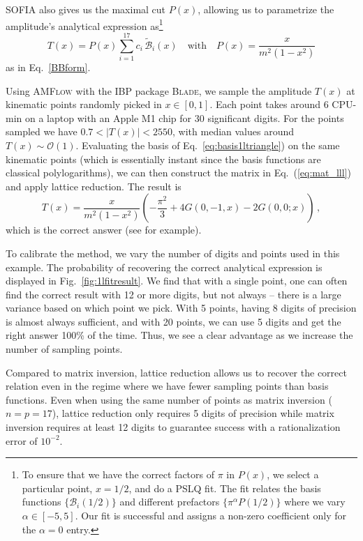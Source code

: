 \documentclass[a4paper,11pt]{article}
\begin{document}
\textsc{SOFIA} also gives us the maximal cut $P(x)$, allowing us to parametrize the amplitude's analytical expression as\footnote{To ensure that we have the correct factors of $\pi$ in $P(x)$, we select a particular point, $x=1/2$, and do a PSLQ fit. The fit relates the basis functions $\{\mathcal{B}_i(1/2)\}$ and different prefactors $\{\pi^\alpha P(1/2)\}$ where we vary $\alpha \in [-5,5]$. Our fit is successful and assigns a non-zero coefficient only for the $\alpha=0$ entry.}
\begin{equation}
    T(x) = P(x) \sum_{i=1}^{17} c_i \, \tilde{\mathcal{B}}_i (x) \quad \text{with} \quad P(x)=\frac{x}{m^2(1-x^2)}
\end{equation}
as in Eq.~\eqref{BBform}.

Using \textsc{AMFlow} with the IBP package \textsc{Blade}, we sample the amplitude $T(x)$ at kinematic points randomly picked in $x\in[0,1]$. Each point takes around 6 CPU-min on a laptop with an Apple M1 chip for 30 significant digits. For the points sampled we have $0.7<|T(x)|<2550$, with median values around $T(x)\sim \mathcal{O}(1)$. 
Evaluating the basis of Eq.~\eqref{eq:basis1ltriangle}) on the same kinematic points (which is essentially instant since the basis functions are classical polylogarithms), we can then construct the matrix in Eq.~(\ref{eq:mat_lll}) and apply lattice reduction.
The result is 
\begin{equation}
    T(x) = \frac{x}{m^2 (1-x^2)} \left(-\frac{\pi^2}{3} + 4 G(0,-1,x) - 2 G(0,0;x)\right) \,,
\end{equation}
which is the correct answer (see \cite{Gehrmann:2013cxs} for example). 

To calibrate the method, we vary the number of digits and points used in this example. The probability of recovering the correct analytical expression is displayed in Fig.~\ref{fig:1lfitresult}. 
We find that with a single point, one can often find the correct result with 12 or more digits, but not always -- there is a large variance based on which point we pick. With 5 points, having 8 digits of precision is almost always sufficient, and with 20 points, we can use 5 digits and get the right answer 100\% of the time.  
Thus, we see a clear advantage as we increase the number of sampling points. 

Compared to  matrix inversion, lattice reduction allows us to recover the correct relation even in the regime where we have fewer sampling points than basis functions. 
Even when using the same number of points as matrix inversion ($n=p=17$), lattice reduction only requires 5 digits of precision while matrix inversion requires at least 12 digits to guarantee success with a rationalization error of $10^{-2}$. 
\end{document}
